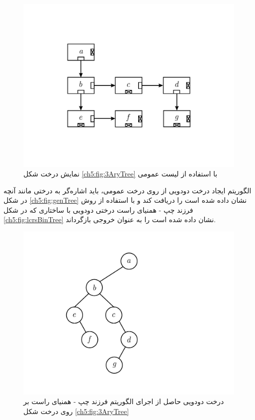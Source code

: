 \begin{figure}
\begin{center}
\includegraphics[scale=0.33]{figs/ch5/general_tree.pdf}
\caption{نمایش درخت شکل {\eqref{ch5:fig:3AryTree}} با استفاده از لیست عمومی}\label{ch5:fig:genTree}
\end{center}
\end{figure}

الگوریتم ایجاد درخت دودویی از روی درخت عمومی، باید اشاره‌گر به درختی مانند آنچه در شکل {\eqref{ch5:fig:genTree}} نشان داده شده است را دریافت کند و با استفاده از روش فرزند چپ - همنیای راست درختی دودویی با ساختاری که در شکل {\eqref{ch5:fig:lcrsBinTree}} نشان داده شده است را به عنوان خروجی بازگرداند.

\begin{figure}
\begin{center}
\includegraphics[scale=0.33]{figs/ch5/left_child_right_sibling_binary_tree.pdf}
\caption{%
درخت دودویی حاصل از اجرای الگوریتم فرزند چپ - همنیای راست بر روی درخت شکل {\eqref{ch5:fig:3AryTree}}
}\label{ch5:fig:lcrsBinTree}
\end{center}
\end{figure}

